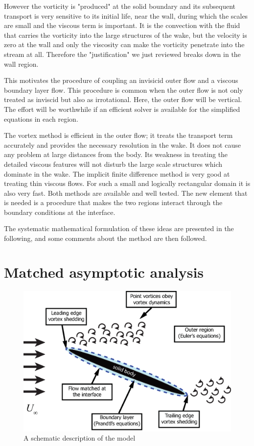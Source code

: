 However the vorticity is "produced" at the solid boundary and its subsequent transport is very sensitive to its initial life, near the wall, during which the scales are small and the viscous term is important.
It is the convection with the fluid that carries the vorticity into the large structures of the wake, but the velocity is zero at the wall and only the viscosity can make the vorticity penetrate into the stream at all.
Therefore the "justification" we just reviewed breaks down in the wall region.

This motivates the procedure of coupling an invisicid outer flow and a viscous boundary layer flow.
This procedure is common when the outer flow is not only treated as inviscid but also as irrotational.
Here, the outer flow will be vertical.
The effort will be worthwhile if an efficient solver is available for the simplified equations in each region.

The vortex method is efficient in the outer flow; it treats the transport term accurately and provides the necessary resolution in the wake.
It does not cause any problem at large distances from the body.
Its weakness in treating the detailed viscous features will not disturb the large scale structures which dominate in the wake.
The implicit finite difference method is very good at treating thin viscous flows.
For such a small and logically rectangular domain it is also very fast.
Both methods are available and well tested.
The new element that is needed is a procedure that makes the two regions interact through the boundary conditions at the interface.

The systematic mathematical formulation of these ideas are presented in the following, and some comments about the method are then followed.


\section{Matched asymptotic analysis}

\begin{figure}
 \begin{center}
 \includegraphics[width = 14cm]{./Figures/ModelSchematic.eps}
\end{center}
 \caption{A schematic description of the model}
 \label{fig:modelschematic}
\end{figure}

